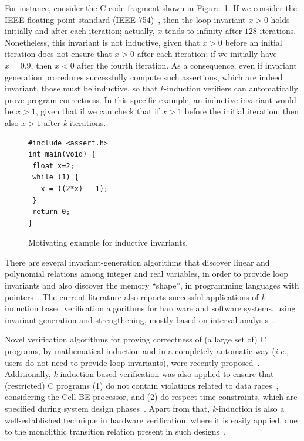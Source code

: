 \documentclass[format=acmsmall, review=false, screen=true]{acmart}
\begin{document}
For instance, consider the C-code fragment shown in Figure~\ref{figure:inductive-invariant}. If we consider the IEEE floating-point standard (IEEE 754)~\cite{4610935,Goldberg91whatevery}, then  the loop invariant $x>0$ holds initially and after each iteration; actually, $x$ tends to infinity after $128$ iterations. Nonetheless, this invariant is not inductive, given that $x>0$ before an initial iteration does not ensure that $x>0$ after each iteration; if we initially have $x=0.9$, then $x<0$ after the fourth iteration. As a consequence, even if invariant generation procedures successfully compute such assertions, which are indeed invariant, those must be inductive, so that \textit{k}-induction verifiers can automatically prove program correctness. In this specific example, an inductive invariant would be $x>1$, given that if we can check that if $x>1$ before the initial iteration, then also $x>1$ after \textit{k} iterations.
%
\begin{figure}[h]
\centering
\begin{minipage}{0.45\textwidth}
\begin{lstlisting}
#include <assert.h>
int main(void) {
 float x=2;
 while (1) {
   x = ((2*x) - 1);
 }
 return 0;
}
\end{lstlisting}
\end{minipage}
\caption{Motivating example for inductive invariants.}
\label{figure:inductive-invariant}
\end{figure}


There are several invariant-generation algorithms that discover linear and polynomial relations among integer and real variables, in order to provide loop invariants and also discover the memory ``shape'', in programming languages with pointers~\cite{pips:2013,Henry:2012}. The current literature also reports successful applications of \textit{k}-induction based verification algorithms for hardware and software systems, using invariant generation and strengthening, mostly based on interval analysis~\cite{Beyer15}. 

Novel verification algorithms for proving correctness of (a large set of) C programs, by mathematical induction and in a completely automatic way ({\it i.e.}, users do not need to provide loop invariants), were recently proposed~\cite{Gadelha15,Beyer15,Brain15,Rocha15,Kinductor,Rocha17}. Additionally, \textit{k}-induction based verification was also applied to ensure that (restricted) C programs (1) do not contain violations related to data races~\cite{Donaldson10}, considering the Cell BE processor, and (2) do respect time constraints, which are specified during system design phases~\cite{EenS03}. Apart from that, \textit{k}-induction is also a well-established technique in hardware verification, where it is easily applied, due to the monolithic transition relation present in such designs~\cite{EenS03,Sheera00,GrosseLD09}.
\end{document}
